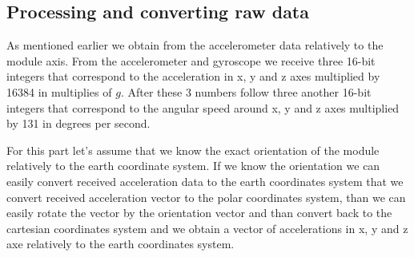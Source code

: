 \documentclass[hidelinks,a4paper]{article}
\begin{document}
\subsection{Processing and converting raw data}
As mentioned earlier we obtain from the accelerometer data relatively to the module axis. From the accelerometer and gyroscope we receive three 16-bit integers that correspond to the acceleration in x, y and z axes multiplied by 16384 in multiplies of $g$. After these 3 numbers follow three another 16-bit integers that correspond to the angular speed around x, y and z axes multiplied by 131 in degrees per second.\par
For this part let's assume that we know the exact orientation of the module relatively to the earth coordinate system. If we know the orientation we can easily convert received acceleration data to the earth coordinates system that we convert received acceleration vector to the polar coordinates system, than we can easily rotate the vector by the orientation vector and than convert back to the cartesian coordinates system and we obtain a vector of accelerations in x, y and z axe relatively to the earth coordinates system.
\end{document}

